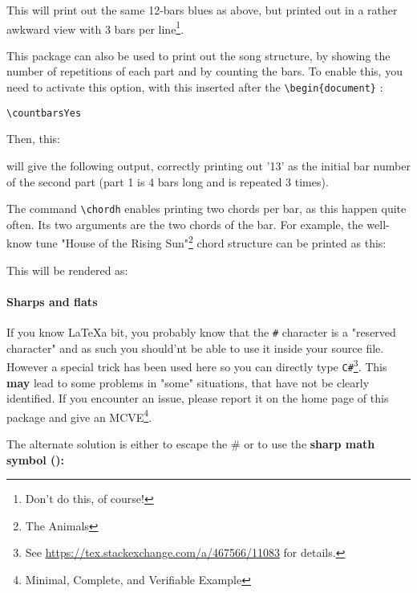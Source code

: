 \documentclass[11pt]{article}
\newcommand{\btt}{\bfseries \ttfamily }
\begin{document}
This will print out the same 12-bars blues as above, but printed out in a rather awkward view with 3 bars per line\footnote{Don't do this, of course!}.

\def\NumberOfBarsPerLine{3}


This package can also be used to print out the song structure, by showing the number of repetitions of each part and by counting the bars.
To enable this, you need to activate this option, with this inserted after the \verb!\begin{document}! :

\begin{lstlisting}
\countbarsYes
\end{lstlisting}

Then, this:


will give the following output, correctly printing out '13' as the initial bar number of the second part (part 1 is 4 bars long and is repeated 3 times).

\def\NumberOfBarsPerLine{4}
\resetchordbars
\countbarsYes


The command \verb|\chordh| enables printing two chords per bar, as this happen quite often.
Its two arguments are the two chords of the bar.
For example, the well-know tune "House of the Rising Sun"\footnote{The Animals} chord structure can be printed as this:



This will be rendered as:
\resetchordbars
\countbarsNo


\paragraph{Sharps and flats} If you know \LaTeX a bit, you probably know that the {\tt \#} character is a "reserved character" and as such you should'nt be able to use it inside your source file.
However a special trick has been used here so you can directly type {\tt C\#}\footnote{See \url{https://tex.stackexchange.com/a/467566/11083} for details.}.
This {\bf may} lead to some problems in "some" situations, that have not be clearly identified.
If you encounter an issue, please report it on the home page of this package and give an MCVE\footnote{Minimal, Complete, and Verifiable Example}.

The alternate solution is either to escape the \# or to use the \btt sharp math symbol ():
\end{document}
